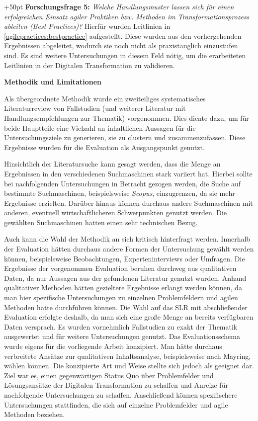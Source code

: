 \hangindent+50pt 
\textbf{Forschungsfrage 5:} \textit{Welche Handlungsmuster lassen sich für einen erfolgreichen Einsatz agiler Praktiken bzw. Methoden im Transformationsprozess ableiten (Best Practices)?}  Hierfür wurden Leitlinien in \ref{agilepractices:bestpractice} aufgestellt. Diese wurden aus den vorhergehenden Ergebnissen abgeleitet, wodurch sie noch nicht als praxistauglich einzustufen sind. Es sind weitere Untersuchungen in diesem Feld nötig, um die erarbeiteten Leitlinien in der Digitalen Transformation zu validieren.

\clearpage

\textbf{Methodik und Limitationen} 

Als übergeordnete Methodik wurde ein zweiteiliges systematisches Literaturreview von Fallstudien (und weiterer Literatur mit Handlungsempfehlungen zur Thematik) vorgenommen. Dies diente dazu, um für beide Hauptteile eine Vielzahl an inhaltlichen Aussagen für die Untersuchungsziele zu generieren, sie zu clustern und zusammenzufassen. Diese Ergebnisse wurden für die Evaluation als Ausgangspunkt genutzt. 

Hinsichtlich der Literatursuche kann gesagt werden, dass die Menge an Ergebnissen in den verschiedenen Suchmaschinen stark variiert hat. Hierbei sollte bei nachfolgenden Untersuchungen in Betracht gezogen werden, die Suche auf bestimmte Suchmaschinen, beispielsweise \textit{Scopus}, einzugrenzen, da sie mehr Ergebnisse erzielten. Darüber hinaus können durchaus andere Suchmaschinen mit anderen, eventuell wirtschaftlicheren Schwerpunkten genutzt werden. Die gewählten Suchmaschinen hatten einen sehr technischen Bezug.

Auch kann die Wahl der Methodik an sich kritisch hinterfragt werden. Innerhalb der Evaluation hätten durchaus andere Formen der Untersuchung gewählt werden können, beispielsweise Beobachtungen, Experteninterviews oder Umfragen. Die Ergebnisse der vorgenommen Evaluation beruhen durchweg aus qualitativen Daten, da nur Aussagen aus der gefundenen Literatur genutzt wurden. Anhand qualitativer Methoden hätten gezieltere Ergebnisse erlangt werden können, da man hier spezifische Untersuchungen zu einzelnen Problemfeldern und agilen Methoden hätte durchführen können. Die Wahl auf das SLR mit abschließender Evaluation erfolgte deshalb, da man sich eine große Menge an bereits verfügbaren Daten versprach. Es wurden vornehmlich Fallstudien zu exakt der Thematik ausgewertet und für weitere Untersuchungen genutzt. Das Evaluationsschema wurde eigens für die vorliegende Arbeit konzipiert. Man hätte durchaus verbreitete Ansätze zur qualitativen Inhaltsanalyse, beispielsweise nach Mayring, wählen können. Die konzipierte Art und Weise stellte sich jedoch als geeignet dar. Ziel war es, einen gegenwärtigen Status Quo über Problemfelder und Lösungsansätze der Digitalen Transformation zu schaffen und Anreize für nachfolgende Untersuchungen zu schaffen. Anschließend können spezifischere Untersuchungen stattfinden, die sich auf einzelne Problemfelder und agile Methoden beziehen. 

